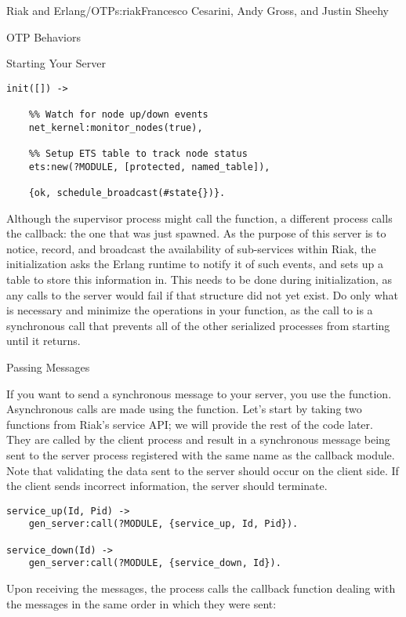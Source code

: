 \begin{aosachapter}{Riak and Erlang/OTP}{s:riak}{Francesco Cesarini, Andy Gross, and Justin Sheehy}
\begin{aosasect1}{OTP Behaviors}
\begin{aosasect2}{Starting Your Server}
\begin{verbatim}
init([]) ->

    %% Watch for node up/down events
    net_kernel:monitor_nodes(true),

    %% Setup ETS table to track node status
    ets:new(?MODULE, [protected, named_table]),

    {ok, schedule_broadcast(#state{})}.
\end{verbatim}

Although the supervisor process might call the 
function, a different process calls the  callback: the
one that was just spawned.  As the purpose of this server is to
notice, record, and broadcast the availability of sub-services within
Riak, the initialization asks the Erlang runtime to notify it of such
events, and sets up a table to store this information in.  This needs
to be done during initialization, as any calls to the server would
fail if that structure did not yet exist. Do only what is necessary
and minimize the operations in your  function, as the call
to  is a synchronous call that prevents all of the other
serialized processes from starting until it returns.

\end{aosasect2}

\begin{aosasect2}{Passing Messages}

If you want to send a synchronous message to your server, you use the
 function. Asynchronous calls are made using
the  function. Let's start by taking two
functions from Riak's service API; we will provide the rest of the
code later. They are called by the client process and result in a
synchronous message being sent to the server process registered with
the same name as the callback module. Note that validating the data
sent to the server should occur on the client side. If the client
sends incorrect information, the server should terminate.

\begin{verbatim}
service_up(Id, Pid) ->
    gen_server:call(?MODULE, {service_up, Id, Pid}).

service_down(Id) ->
    gen_server:call(?MODULE, {service_down, Id}).
\end{verbatim}

\noindent Upon receiving the messages, the  process calls the
 callback function dealing with the messages in
the same order in which they were sent:


\end{aosasect2}
\end{aosasect1}
\end{aosachapter}
